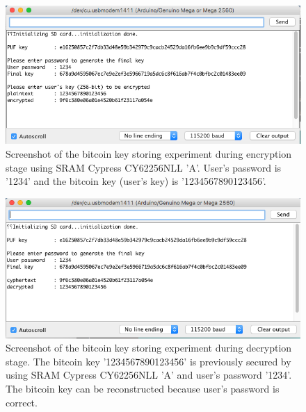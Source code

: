 \begin{figure}[tph!]
    \centerline{\includegraphics[width={\textwidth}]{images/A_encrypt}}
    \caption{Screenshot of the bitcoin key storing experiment during encryption stage using SRAM Cypress CY62256NLL 'A'.
    User's password is '1234' and the bitcoin key (user's key) is '1234567890123456'.}
    \label{fig:A_encrypt}
\end{figure}

\begin{figure}[tph!]
    \centerline{\includegraphics[width={\textwidth}]{images/A_decrypt_correct}}
    \caption{Screenshot of the bitcoin key storing experiment during decryption stage. The bitcoin key '1234567890123456' is previously secured by using SRAM Cypress CY62256NLL 'A' and user's password '1234'.
    The bitcoin key can be reconstructed because user's password is correct.}
    \label{fig:A_decrypt_correct}
\end{figure}

